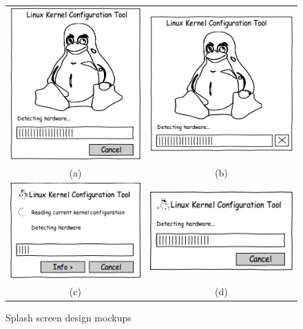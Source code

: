 \documentclass{chi2009}
\begin{document}
\begin{figure}[!t]
 \centering
\begin{tabular}{SS}
 \includegraphics[scale=0.5,keepaspectratio=true]{figs/splash-big} & \includegraphics[scale=0.5,keepaspectratio=true]{figs/splash-bigico} \\
 (a) & (b) \\
 \includegraphics[scale=0.5,keepaspectratio=true]{figs/splash-readingcurrent} &
 \includegraphics[scale=0.5,keepaspectratio=true]{figs/splash-standard} \\
 (c) & (d) \\
\end{tabular}
\caption{Splash screen design mockups}
\label{fig:splash}
\end{figure}
\end{document}
